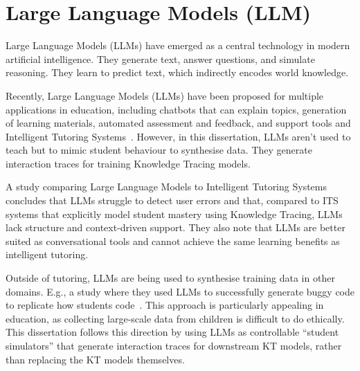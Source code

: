 \section{Large Language Models (LLM)}
Large Language Models (LLMs) have emerged as a central technology in modern artificial intelligence. They generate text, answer questions, and simulate reasoning. They learn to predict text, which indirectly encodes world knowledge.

Recently, Large Language Models (LLMs) have been proposed for multiple applications in education, including chatbots that can explain topics, generation of learning materials, automated assessment and feedback, and support tools and Intelligent Tutoring Systems~\autocite{LLMs_in_Education}. However, in this dissertation, LLMs aren't used to teach but to mimic student behaviour to synthesise data. They generate interaction traces for training Knowledge Tracing models.

A study comparing Large Language Models to Intelligent Tutoring Systems~\autocite{LLM_vs_ITS} concludes that LLMs struggle to detect user errors and that, compared to ITS systems that explicitly model student mastery using Knowledge Tracing, LLMs lack structure and context-driven support. They also note that LLMs are better suited as conversational tools and cannot achieve the same learning benefits as intelligent tutoring.

Outside of tutoring, LLMs are being used to synthesise training data in other domains. E.g., a study where they used LLMs to successfully generate buggy code to replicate how students code~\autocite{LLM_buggy_code_synthesis}. This approach is particularly appealing in education, as collecting large-scale data from children is difficult to do ethically. This dissertation follows this direction by using LLMs as controllable “student simulators” that generate interaction traces for downstream KT models, rather than replacing the KT models themselves.

